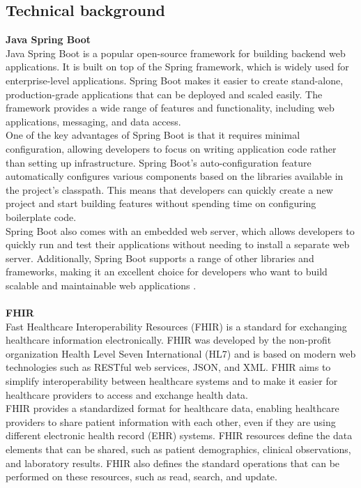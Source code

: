 \documentclass[]{report}
\begin{document}
\subsection{Technical background}
\textbf{Java Spring Boot}\\
Java Spring Boot is a popular open-source framework for building backend web applications. It is built on top of the Spring framework, which is widely used for enterprise-level applications. Spring Boot makes it easier to create stand-alone, production-grade applications that can be deployed and scaled easily. The framework provides a wide range of features and functionality, including web applications, messaging, and data access.\\
One of the key advantages of Spring Boot is that it requires minimal configuration, allowing developers to focus on writing application code rather than setting up infrastructure. Spring Boot's auto-configuration feature automatically configures various components based on the libraries available in the project's classpath. This means that developers can quickly create a new project and start building features without spending time on configuring boilerplate code.\\
Spring Boot also comes with an embedded web server, which allows developers to quickly run and test their applications without needing to install a separate web server. Additionally, Spring Boot supports a range of other libraries and frameworks, making it an excellent choice for developers who want to build scalable and maintainable web applications \cite{spring-io}.\\\\
\textbf{FHIR}\\
Fast Healthcare Interoperability Resources (FHIR) is a standard for exchanging healthcare information electronically. FHIR was developed by the non-profit organization Health Level Seven International (HL7) and is based on modern web technologies such as RESTful web services, JSON, and XML. FHIR aims to simplify interoperability between healthcare systems and to make it easier for healthcare providers to access and exchange health data.\\
FHIR provides a standardized format for healthcare data, enabling healthcare providers to share patient information with each other, even if they are using different electronic health record (EHR) systems. FHIR resources define the data elements that can be shared, such as patient demographics, clinical observations, and laboratory results. FHIR also defines the standard operations that can be performed on these resources, such as read, search, and update.\\
\end{document}
